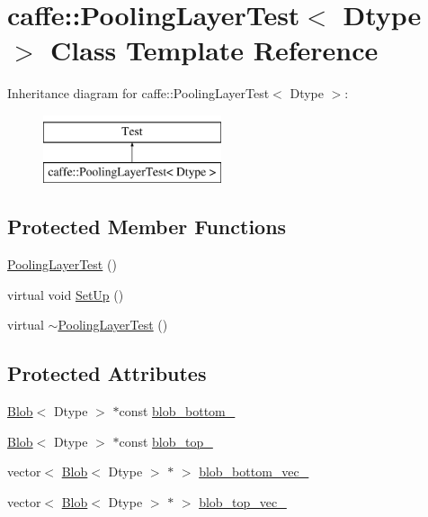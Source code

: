 \hypertarget{classcaffe_1_1_pooling_layer_test}{\section{caffe\+:\+:Pooling\+Layer\+Test$<$ Dtype $>$ Class Template Reference}
\label{classcaffe_1_1_pooling_layer_test}
}
Inheritance diagram for caffe\+:\+:Pooling\+Layer\+Test$<$ Dtype $>$\+:\begin{figure}[H]
\begin{center}
\leavevmode
\includegraphics[height=2.000000cm]{classcaffe_1_1_pooling_layer_test}
\end{center}
\end{figure}
\subsection*{Protected Member Functions}
\begin{DoxyCompactItemize}
\item 
\hyperlink{classcaffe_1_1_pooling_layer_test_a7742eacaa14ae7a01fed87b54ee5bdd1}{Pooling\+Layer\+Test} ()
\item 
virtual void \hyperlink{classcaffe_1_1_pooling_layer_test_a814208159f9155a7d28cfe289fe1414c}{Set\+Up} ()
\item 
virtual \hyperlink{classcaffe_1_1_pooling_layer_test_a9575a28a7718df9a3e77d6984b9f8f46}{$\sim$\+Pooling\+Layer\+Test} ()
\end{DoxyCompactItemize}
\subsection*{Protected Attributes}
\begin{DoxyCompactItemize}
\item 
\hyperlink{classcaffe_1_1_blob}{Blob}$<$ Dtype $>$ $\ast$const \hyperlink{classcaffe_1_1_pooling_layer_test_ad6228ca6fb50a4e589f18fd314be0019}{blob\+\_\+bottom\+\_\+}
\item 
\hyperlink{classcaffe_1_1_blob}{Blob}$<$ Dtype $>$ $\ast$const \hyperlink{classcaffe_1_1_pooling_layer_test_aadabc8d33eec24086aedbf96c963518c}{blob\+\_\+top\+\_\+}
\item 
vector$<$ \hyperlink{classcaffe_1_1_blob}{Blob}$<$ Dtype $>$ $\ast$ $>$ \hyperlink{classcaffe_1_1_pooling_layer_test_a4441920a9bb7a9e7aac0a7298da8b13b}{blob\+\_\+bottom\+\_\+vec\+\_\+}
\item 
vector$<$ \hyperlink{classcaffe_1_1_blob}{Blob}$<$ Dtype $>$ $\ast$ $>$ \hyperlink{classcaffe_1_1_pooling_layer_test_a9ffa0628b08c6223f2f8fd4646ef0aca}{blob\+\_\+top\+\_\+vec\+\_\+}
\end{DoxyCompactItemize}



